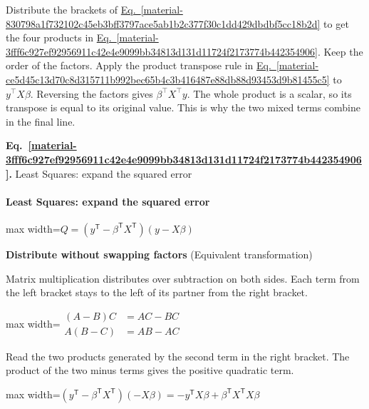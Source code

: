 \documentclass[11pt,a4paper]{article}
\begin{document}
Distribute the brackets of \hyperref[material-830798a1f732102c45eb3bff3797ace5ab1b2c377f30c1dd429dbdbf5cc18b2d]{Eq.~\ref*{material-830798a1f732102c45eb3bff3797ace5ab1b2c377f30c1dd429dbdbf5cc18b2d}} to get the four products in \hyperref[material-3fff6c927ef92956911c42e4e9099bb34813d131d11724f2173774b442354906]{Eq.~\ref*{material-3fff6c927ef92956911c42e4e9099bb34813d131d11724f2173774b442354906}}. Keep the order of the factors. Apply the product transpose rule in \hyperref[material-ce5d45c13d70c8d315711b992bec65b4c3b416487e88db88d93453d9b81455c5]{Eq.~\ref*{material-ce5d45c13d70c8d315711b992bec65b4c3b416487e88db88d93453d9b81455c5}} to \(y^\top X\beta\). Reversing the factors gives \(\beta^\top X^\top y\). The whole product is a scalar, so its transpose is equal to its original value. This is why the two mixed terms combine in the final line.


\par\medskip
{}
\label{material-3fff6c927ef92956911c42e4e9099bb34813d131d11724f2173774b442354906}
\noindent\textbf{Eq.~\ref*{material-3fff6c927ef92956911c42e4e9099bb34813d131d11724f2173774b442354906}.} Least Squares: expand the squared error\par\nopagebreak
\paragraph{Least Squares: expand the squared error}
\begin{center}\begin{adjustbox}{max width=\linewidth}$\displaystyle Q=(y^{\mathsf T}-\beta^{\mathsf T}X^{\mathsf T})(y-X\beta)$\end{adjustbox}\end{center}
\noindent\textbf{Distribute without swapping factors} (Equivalent transformation)\par
Matrix multiplication distributes over subtraction on both sides. Each term from the left bracket stays to the left of its partner from the right bracket.
\begin{center}\begin{adjustbox}{max width=\linewidth}$\displaystyle \begin{aligned}(A-B)C&=AC-BC\\A(B-C)&=AB-AC\end{aligned}$\end{adjustbox}\end{center}

Read the two products generated by the second term in the right bracket. The product of the two minus terms gives the positive quadratic term.
\begin{center}\begin{adjustbox}{max width=\linewidth}$\displaystyle (y^{\mathsf T}-\beta^{\mathsf T}X^{\mathsf T})(-X\beta)=-y^{\mathsf T}X\beta+\beta^{\mathsf T}X^{\mathsf T}X\beta$\end{adjustbox}\end{center}
\end{document}
